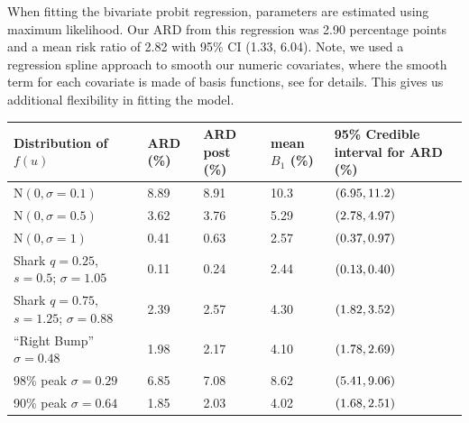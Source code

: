 \documentclass[aoas,preprint, 11pt, dvipsnames, table, x11name]{imsart}
\newcommand{\N}{\mbox{N}}
\theoremstyle{remark}
\begin{document}
When fitting the bivariate probit regression, parameters are estimated using maximum likelihood. Our ARD from this regression was 2.90 percentage points and a mean risk ratio of 2.82 with 95\% CI (1.33, 6.04).  Note, we used a regression spline approach to smooth our numeric covariates, where the smooth term for each covariate is made of basis functions, see \cite{marra} for details.  This gives us additional flexibility in fitting the model.

\begin{table}[h]
	\centering
	\begin{tabular}{lP{1.1cm}P{1.1cm}P{1.1cm}P{2.3cm}}
		\toprule
		Distribution of $f(u)$  & ARD (\%)&ARD post (\%)& mean $B_1$ (\%) &95\% Credible interval for ARD (\%)  \\ \midrule
		$\N(0,\sigma=0.1)$ &8.89&8.91&10.3&$\qty(6.95, 11.2)$\\ %
		$\N(0,\sigma=0.5)$ &3.62&3.76 &5.29 &$\qty(2.78, 4.97)$\\%
		$\N(0,\sigma=1)$&0.41&0.63&2.57&$\qty(0.37, 0.97)$\\
		Shark $q=0.25$, $s=0.5$; $\sigma=1.05$&0.11&0.24&2.44&$\qty(0.13, 0.40)$\\
		Shark $q=0.75$, $s=1.25$; $\sigma=0.88$&2.39&2.57&4.30&$\qty(1.82, 3.52)$\\
		
		``Right Bump'' $\sigma=0.48$&1.98&2.17&4.10&$\qty(1.78, 2.69)$\\
		98\% peak $\sigma=0.29$&6.85&7.08&8.62&$\qty(5.41, 9.06)$\\
		90\% peak $\sigma=0.64$&1.85&2.03&4.02&$\qty(1.68, 2.51)$\\
		

\end{tabular}
\end{table}
\end{document}
